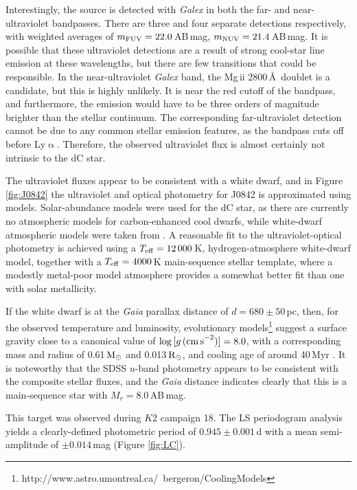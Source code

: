 \documentclass[fleqn,usenatbib,useAMS]{mnras}
\newcommand{\Rsun}{\ensuremath{\rm{R}_\odot}}
\newcommand{\Msun}{\ensuremath{\rm{M}_\odot}}
\begin{document}
Interestingly, the source is detected with {\em Galex} in both the far- and near-ultraviolet bandpasses.  There are three and four separate detections respectively, with weighted averages of $m_{\rm FUV}=22.0$\,AB\,mag, $m_{\rm NUV}=21.4$\,AB\,mag.  It is possible that these ultraviolet detections are a result of strong cool-star line emission at these wavelengths, but there are few transitions that could be responsible.  In the near-ultraviolet {\em Galex} band, the Mg\,{\sc ii} 2800\,\AA \ doublet is a candidate, but this is highly unlikely.  It is near the red cutoff of the bandpass, and furthermore, the emission would have to be three orders of magnitude brighter than the stellar continuum.  The corresponding far-ultraviolet detection cannot be due to any common stellar emission features, as the bandpass cuts off before Ly$\upalpha$.  Therefore, the observed ultraviolet flux is almost certainly not intrinsic to the dC star.

The ultraviolet fluxes appear to be consistent with a white dwarf, and in Figure \ref{fig:J0842} the ultraviolet and optical photometry for J0842 is approximated using models.  Solar-abundance models \citep{Kurucz03} were used for the dC star, as there are currently no atmospheric models for carbon-enhanced cool dwarfs, while white-dwarf atmospheric models were taken from \citet{Koester10}.  A reasonable fit to the ultraviolet-optical photometry is achieved using a $T_{\rm eff}=12\,000$\,K, hydrogen-atmosphere white-dwarf model, together with a $T_{\rm eff}=4000$\,K main-sequence stellar template, where a modestly metal-poor model atmosphere provides a somewhat better fit than one with solar metallicity.

If the white dwarf is at the {\em Gaia} parallax distance of $d=680\pm50$\,pc, then, for the observed temperature and luminosity, evolutionary models\footnote{http://www.astro.umontreal.ca/~bergeron/CoolingModels} suggest a surface gravity close to a canonical value of $\log\,[g\,{\rm (cm\,s}^{-2})] = 8.0$, with a corresponding mass and radius of 0.61\,$\Msun$ and 0.013\,$\Rsun$, and cooling age of around 40\,Myr \citep{Fontaine01}.  It is noteworthy that the SDSS $u$-band photometry appears to be consistent with the composite stellar fluxes, and the {\em Gaia} distance indicates clearly that this is a main-sequence star with $M_r=8.0$\,AB\,mag.  

This target was observed during $K2$ campaign 18.  The LS periodogram analysis yields a clearly-defined photometric period of $0.945\pm0.001$\,d with a mean semi-amplitude of $\pm0.014$\,mag (Figure \ref{fig:LC}).  
\end{document}
